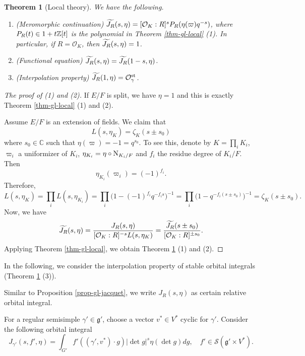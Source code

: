 \documentclass[a4paper]{amsart}
\newcommand{\BC}{{\mathbb {C}}} \newcommand{\BD}{{\mathbb {D}}}
\newcommand{\CO}{{\mathcal {O}}} \newcommand{\CP}{{\mathcal {P}}}
\newcommand{\CS}{{\mathcal {S}}} \newcommand{\CT}{{\mathcal {T}}}
\newcommand{\fg}{{\mathfrak{g}}} \newcommand{\fh}{{\mathfrak{h}}}
\newcommand{\st}{{\mathrm{st}}}\newcommand{\supp}{{\mathrm{supp}}}
\theoremstyle{plain}
\newtheorem{thm}{Theorem}[section] \newtheorem{cor}[thm]{Corollary}
\theoremstyle{remark} \newtheorem{remark}[thm]{Remark}
\theoremstyle{exercise} \newtheorem{exercise}[thm]{Exercise}
\theoremstyle{example} \newtheorem{example}[thm]{Example}
\theoremstyle{question} \newtheorem{question}[thm]{Question}
\theoremstyle{assumption} \newtheorem{assumption}[thm]{Assumption}
\numberwithin{equation}{section}
\begin{document}
\begin{thm}[Local theory]\label{thm-unitary-local} We have the following.
\begin{enumerate}	
    \item (Meromorphic continuation) 
			$\wt{J_R}(s,\eta) = [\CO_K:R]^sP_R(\eta(\varpi)q^{-s})$, where $P_R(t) \in 1 + t{\mathbb {Z}}[t]$ is the polynomial in Theorem \ref{thm-gl-local} (1). 
			In particular, if $R = \CO_K$, then $\widetilde{J_R}(s,\eta) = 1$.
    \item (Functional equation) $\widetilde{J_R}(s,\eta) = \widetilde{J_R}(1-s,\eta)$.
	\item (Interpolation property) $\wt{J_R}(1,\eta) = \CO_\gamma^\st$. 
\end{enumerate}
\end{thm}
\begin{proof}[The proof of (1) and (2)]
    
  If $E/F$ is split, we have $\eta = 1$ and this is exactly Theorem \ref{thm-gl-local} (1) and (2).

  Assume $E/F$ is an extension of fields. We claim that
  \[L(s,\eta_K) = \zeta_K(s \pm s_0)\]
  where $s_0 \in \BC$ such that $\eta(\varpi) = -1 = q^{s_0}$. 
  To see this, denote by $K = \prod_i K_i$, $\varpi_i$ a
  uniformizer of $K_i$, $\eta_{K_i} = \eta \circ {\mathrm {N}}_{K_i/F}$ and $f_i$ the residue degree of $K_i/F$. Then
  \[\eta_{K_i}(\varpi_i) = (-1)^{f_i}.\]
  Therefore,
\[L(s,\eta_K)=\prod_{i}L(s,\eta_{K_i})=\prod_{i}\bigl(1-(-1)^{f_i}q^{-f_is}\bigr)^{-1}=\prod_{i}\bigl(1-q^{-f_i(s\pm s_0)}\bigr)^{-1}=\zeta_K(s\pm s_0).\]
   Now, we have
\[\wt{J_R}(s,\eta)=\frac{J_R(s,\eta)}{[\CO_K:R]^{-s} L(s,\eta_K)}
=\frac{\wt{J_R}(s\pm s_0)}{[\CO_K:R]^{\pm s_0}}.  \]    
    Applying Theorem \ref{thm-gl-local}, we obtain Theorem 
\ref{thm-unitary-local} (1) and (2).
    
    

    
\end{proof}

In the following, we consider the interpolation property 
of stable orbital integrals (Theorem \ref{thm-unitary-local} (3)).


Similar to Proposition \ref{prop-gl-jacquet}, we write $J_R(s,\eta)$ as certain relative orbital integral.


For a regular semisimple $\gamma' \in \fg'$, choose a vector $v^* \in V^*$ cyclic for $\gamma'$.  Consider the following orbital integral
\[J_{\gamma'}(s,f',\eta) = \int_{G'} f'\left( (\gamma',v^*) \cdot g \right) |\det g|^s \eta(\det g) dg, \quad f' \in \CS(\fg' \times V^*).\]
 
\end{document}
